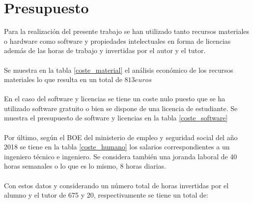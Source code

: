 \section{Presupuesto}
Para la realización del presente trabajo se han utilizado tanto recursos materiales o hardware como software y propiedades intelectuales en forma de licencias además de las horas de trabajo y invertidas por el autor y el tutor. 
\\
\\
Se muestra en la tabla \ref{coste_material} el análisis económico de los recursos materiales lo que resulta en un total de $813 euros$ 
\\
\\
En el caso del software y licencias se tiene un coste nulo puesto que se ha utilizado software gratuito o bien se dispone de una licencia de estudiante. Se muestra el presupuesto de software y licencias en la tabla \ref{coste_software}
\\
\\
Por último, según el BOE del ministerio de empleo y seguridad social del año 2018\cite{BOE} se tiene en la tabla \ref{coste_humano} los salarios correspondientes a un ingeniero técnico e ingeniero. Se considera también una joranda laboral de 40 horas semanales o lo que es lo mismo, 8 horas diarias.
\\
\\
Con estos datos y considerando un número total de horas invertidas por el alumno y el tutor de 675 y 20, respectivamente se tiene un total de:

